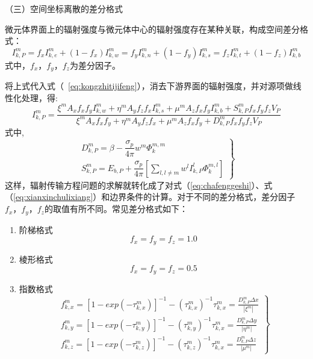 （三）空间坐标离散的差分格式

微元体界面上的辐射强度与微元体中心的辐射强度存在某种关联，构成空间差分格式：
\begin{equation}
I_{k,P}^m = {f_x}I_{k,e}^m + (1 - {f_x})I_{k,w}^m = {f_y}I_{k,n}^m + (1 - {f_y})I_{k,s}^m = {f_z}I_{k,t}^m + (1 - {f_z})I_{k,b}^m \label{eq:chafenggeshi}
\end{equation}
式中，$f_x$，$f_y$，$f_z$为差分因子。

将上式代入式（~\ref{eq:kongzhitijifeng}），消去下游界面的辐射强度，并对源项做线性化处理，得:
\begin{equation}
I_{k,P}^m = \frac{{{\xi ^m}{A_x}{f_x}{f_y}I_{k,w}^m + {\eta ^m}{A_y}{f_z}{f_x}I_{k,s}^m + {\mu ^m}{A_z}{f_x}{f_y}I_{k,b}^m + S_{k,P}^m{f_x}{f_y}{f_z}{V_P}}}{{{\xi ^m}{A_x}{f_x}{f_y} + {\eta ^m}{A_y}{f_z}{f_x} + {\mu ^m}{A_z}{f_x}{f_y} + D_{k,P}^m{f_x}{f_y}{f_z}{V_P}}} \label{eq:xianxinchulixiang}
\end{equation}
式中,
\begin{equation}
\left. \begin{array}{l}
D_{k,P}^m = \beta  - \dfrac{{{\sigma _p}}}{{4\pi }}{w^m}\Phi _k^{m,m}\\
S_{k,P}^m = {E_{b,P}} + \dfrac{{{\sigma _p}}}{{4\pi }}[\sum\limits_{l,l \ne m}^{} {{w^l}I_{k,P}^l\Phi _k^{m,l}} ]
\end{array} \right\}
\end{equation}
这样，辐射传输方程问题的求解就转化成了对式（\ref{eq:chafenggeshi}）、式（\ref{eq:xianxinchulixiang}）和边界条件的计算。对于不同的差分格式，差分因子$f_x，f_y，f_z$的取值有所不同。常见差分格式如下：
\begin{enumerate}
	\item[\circle{1}] 阶梯格式
	\begin{equation}
	{f_x} = {f_y} = {f_z} = 1.0
	\end{equation}
	\item[\circle{2}] 棱形格式
	\begin{equation}
	{f_x} = {f_y} = {f_z} = 0.5
	\end{equation}
	\item[\circle{3}] 指数格式
	\begin{equation}
\left. \begin{array}{l}
f_{k,x}^m = {[1 - exp( - \tau _{k,x}^m)]^{ - 1}} - {(\tau _{k,x}^m)^{ - 1}}\tau _{k,x}^m = \frac{{D_{k,P}^m\Delta x}}{{\left| {{\xi ^m}} \right|}}\\
f_{k,y}^m = {[1 - exp( - \tau _{k,y}^m)]^{ - 1}} - {(\tau _{k,y}^m)^{ - 1}}\tau _{k,x}^m = \frac{{D_{k,P}^m\Delta y}}{{\left| {{\eta ^m}} \right|}}\\
f_{k,z}^m = {[1 - exp( - \tau _{k,z}^m)]^{ - 1}} - {(\tau _{k,z}^m)^{ - 1}}\tau _{k,x}^m = \frac{{D_{k,P}^m\Delta z}}{{\left| {{\mu ^m}} \right|}}
\end{array} \right\}
	\end{equation}
\end{enumerate}
